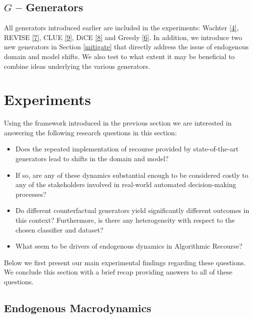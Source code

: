 \documentclass[conference,final,]{IEEEtran}
\providecommand{\tightlist}{%
  \setlength{\itemsep}{0pt}\setlength{\parskip}{0pt}}
\begin{document}
\hypertarget{g-generators}{%
\subsection{\texorpdfstring{\(G\) -- Generators}{G -- Generators}}\label{g-generators}}

All generators introduced earlier are included in the experiments: Wachter \protect\hyperlink{ref-wachter2017counterfactual}{{[}4{]}}, REVISE \protect\hyperlink{ref-joshi2019towards}{{[}7{]}}, CLUE \protect\hyperlink{ref-antoran2020getting}{{[}9{]}}, DiCE \protect\hyperlink{ref-mothilal2020explaining}{{[}8{]}} and Greedy \protect\hyperlink{ref-schut2021generating}{{[}6{]}}. In addition, we introduce two new generators in Section \ref{mitigate} that directly address the issue of endogenous domain and model shifts. We also test to what extent it may be beneficial to combine ideas underlying the various generators.

\hypertarget{empirical-2}{%
\section{Experiments}\label{empirical-2}}

Using the framework introduced in the previous section we are interested in answering the following research questions in this section:

\begin{itemize}
\tightlist
\item
  Does the repeated implementation of recourse provided by state-of-the-art generators lead to shifts in the domain and model?
\item
  If so, are any of these dynamics substantial enough to be considered costly to any of the stakeholders involved in real-world automated decision-making processes?
\item
  Do different counterfactual generators yield significantly different outcomes in this context? Furthermore, is there any heterogeneity with respect to the chosen classifier and dataset?
\item
  What seem to be drivers of endogenous dynamics in Algorithmic Recourse?
\end{itemize}

Below we first present our main experimental findings regarding these questions. We conclude this section with a brief recap providing answers to all of these questions.

\hypertarget{endogenous-macrodynamics}{%
\subsection{Endogenous Macrodynamics}\label{endogenous-macrodynamics}}
\end{document}
